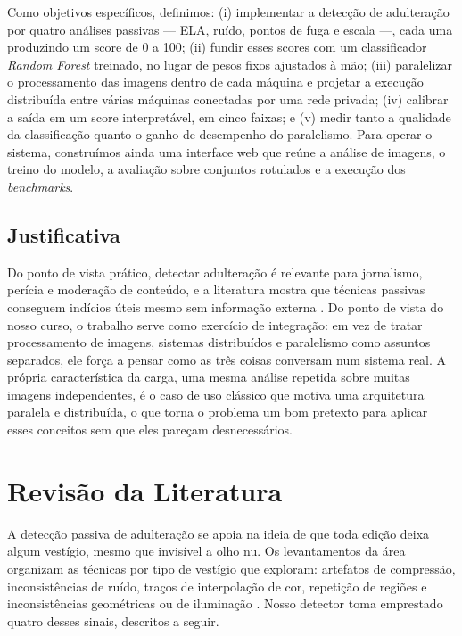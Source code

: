 \documentclass[12pt]{article}
\begin{document}
Como objetivos específicos, definimos: (i) implementar a detecção de adulteração
por quatro análises passivas --- ELA, ruído, pontos de fuga e escala ---, cada
uma produzindo um score de 0 a 100; (ii) fundir esses scores com um classificador
\textit{Random Forest} treinado, no lugar de pesos fixos ajustados à mão; (iii)
paralelizar o processamento das imagens dentro de cada máquina e projetar a
execução distribuída entre várias máquinas conectadas por uma rede privada; (iv)
calibrar a saída em um score interpretável, em cinco faixas; e (v) medir tanto a
qualidade da classificação quanto o ganho de desempenho do paralelismo. Para
operar o sistema, construímos ainda uma interface web que reúne a análise de
imagens, o treino do modelo, a avaliação sobre conjuntos rotulados e a execução
dos \textit{benchmarks}.

\subsection{Justificativa}

Do ponto de vista prático, detectar adulteração é relevante para jornalismo,
perícia e moderação de conteúdo, e a literatura mostra que técnicas passivas
conseguem indícios úteis mesmo sem informação externa \cite{farid2009}. Do ponto
de vista do nosso curso, o trabalho serve como exercício de integração: em vez de
tratar processamento de imagens, sistemas distribuídos e paralelismo como
assuntos separados, ele força a pensar como as três coisas conversam num sistema
real. A própria característica da carga, uma mesma análise repetida sobre muitas
imagens independentes, é o caso de uso clássico que motiva uma arquitetura
paralela e distribuída, o que torna o problema um bom pretexto para aplicar esses
conceitos sem que eles pareçam desnecessários.

\section{Revisão da Literatura}

A detecção passiva de adulteração se apoia na ideia de que toda edição deixa
algum vestígio, mesmo que invisível a olho nu. Os levantamentos da área
organizam as técnicas por tipo de vestígio que exploram: artefatos de
compressão, inconsistências de ruído, traços de interpolação de cor, repetição
de regiões e inconsistências geométricas ou de iluminação
\cite{farid2009,birajdar2013}. Nosso detector toma emprestado quatro desses
sinais, descritos a seguir.
\end{document}

